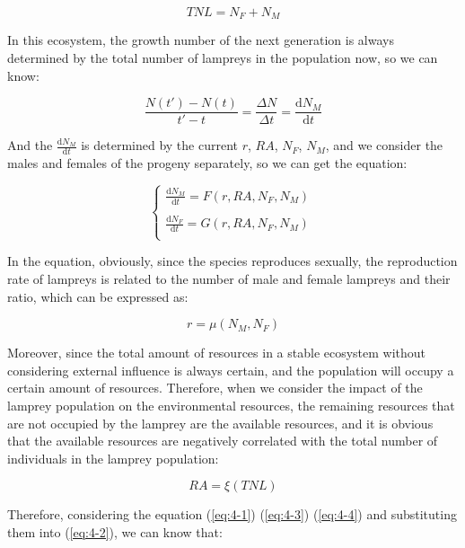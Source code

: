 \documentclass[12pt]{article}  %
\begin{document}
\begin{equation}\label{eq:4-1}
		TNL = N_{F} + N_{M} 
\end{equation}

In this ecosystem, the growth number of the next generation is always determined by the total number of lampreys in the population now, so we can know:

\begin{equation}\label{eq:4-2}
	\frac{N(t')-N(t)}{t'-t}=\frac{\Delta N}{\Delta t}=\frac{\mathrm{d}N_{M}}{\mathrm{d}t}
\end{equation}

And the $\frac{\mathrm{d}N_{M}}{\mathrm{d}t}$ is determined by the current $r$, $RA$, $N_F$, $N_M$, and we consider the males and females of the progeny separately, so we can get the equation:

\begin{equation}\label{eq:4-3}
\begin{cases}
	\frac{\mathrm{d}N_{M}}{\mathrm{d}t}=F(r,RA,N_{F},N_{M})\
	\\ \\
	\frac{\mathrm{d}N_{F}}{\mathrm{d}t}=G(r,RA,N_{F},N_{M})\\
\end{cases}
\end{equation}

In the equation, obviously, since the species reproduces sexually, the reproduction rate of lampreys is related to the number of male and female lampreys and their ratio, which can be expressed as:

\begin{equation}\label{eq:4-4}
r = \mu(N_{M},N_{F})
\end{equation}

Moreover, since the total amount of resources in a stable ecosystem without considering external influence is always certain, and the population will occupy a certain amount of resources. Therefore, when we consider the impact of the lamprey population on the environmental resources, the remaining resources that are not occupied by the lamprey are the available resources, and it is obvious that the available resources are negatively correlated with the total number of individuals in the lamprey population:

\begin{equation}\label{eq:4-5}
RA = \xi(TNL)
\end{equation}

Therefore, considering the equation (\ref{eq:4-1}) (\ref{eq:4-3}) (\ref{eq:4-4}) and substituting them into (\ref{eq:4-2}), we can know that:
\end{document}
